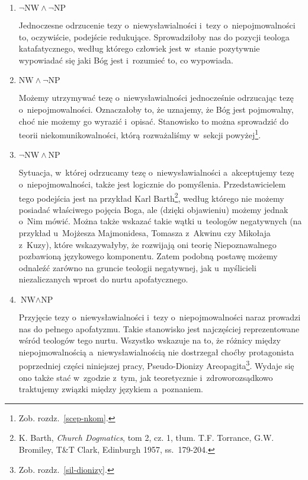 \begin{enumerate}[label = \arabic*), itemindent=6mm, labelwidth=4mm, labelsep=2mm, itemsep=1em, leftmargin=0mm]
\item $\neg \text{NW} \land \neg \text{NP}$

Jednoczesne odrzucenie tezy o~niewysławialności i~tezy o~niepojmowalności to, oczywiście, podejście redukujące. Sprowadziłoby nas do pozycji teologa katafatycznego, według którego człowiek jest w~stanie pozytywnie wypowiadać się jaki Bóg jest i~rozumieć to, co wypowiada.

\item $\text{NW} \land \neg \text{NP}$

Możemy utrzymywać tezę o~niewysławialności jednocześnie odrzucając tezę o~niepojmowalności. Oznaczałoby to, że uznajemy, że Bóg jest pojmowalny, choć nie możemy go wyrazić i~opisać. Stanowisko to można sprowadzić do teorii niekomunikowalności, którą rozważaliśmy w~sekcji powyżej\footnote{Zob. rozdz.~\ref{scep-nkom}.}.

\item $\neg \text{NW} \land \text{NP}$

Sytuacja, w~której odrzucamy tezę o~niewysławialności a~akceptujemy tezę o~niepojmowalności, także jest logicznie do pomyślenia. Przedstawicielem tego podejścia jest na przykład Karl Barth\footnote{K. Barth, \textit{Church Dogmatics}, tom 2, cz. 1, tłum. T.F. Torrance, G.W. Bromiley, T\&T Clark, Edinburgh 1957, ss.~179-204.}, według którego nie możemy posiadać właściwego pojęcia Boga, ale (dzięki objawieniu) możemy jednak o~Nim mówić. Można także wskazać takie wątki u~teologów negatywnych (na przykład u~Mojżesza Majmonidesa, Tomasza z~Akwinu czy Mikołaja z~Kuzy), które wskazywałyby, że rozwijają oni teorię Niepoznawalnego pozbawioną językowego komponentu. Zatem podobną postawę możemy odnaleźć zarówno na gruncie teologii negatywnej, jak u~myślicieli niezaliczanych wprost do nurtu apofatycznego.

\item $\text{NW} \land \text{NP}$

Przyjęcie tezy o~niewysławialności i~tezy o~niepojmowalności naraz prowadzi nas do pełnego apofatyzmu. Takie stanowisko jest najczęściej reprezentowane wśród teologów tego nurtu. Wszystko wskazuje na to, że różnicy między niepojmowalnością a~niewysławialnością nie dostrzegał choćby protagonista poprzedniej części niniejszej pracy, Pseudo-Dionizy Areopagita\footnote{Zob. rozdz.~\ref{sil-dionizy}.}. Wydaje się ono także stać w~zgodzie z~tym, jak teoretycznie i~zdroworozsądkowo traktujemy związki między językiem a~poznaniem.
\end{enumerate}

